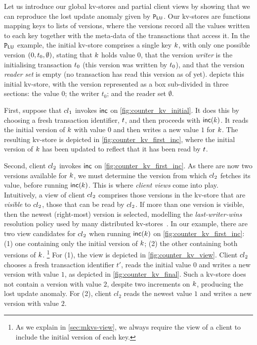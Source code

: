 Let us introduce  our global kv-stores and partial client views by
showing that we can reproduce the lost update anomaly given by 
$\mathtt{P}_{\mathsf{LU}}$.
Our kv-stores are functions mapping keys to lists of versions, where
the versions  record all the values written to each key together with the
meta-data of the transactions that access it. 
In the $\mathtt{P}_{\mathsf{LU}}$ example, the initial kv-store comprises a single key $k$, with only one possible 
version $(0, t_{0}, \emptyset)$,  stating that $k$ holds value $0$, 
that the version \emph{writer} is the initialising transaction
$t_0$ (this version was written by $t_0$), 
and that the version \emph{reader set} is empty (no transaction has read this version as of yet). 
 depicts this initial kv-store, with the version
represented as a box sub-divided in three sections: the value $0$;
the writer $t_0$; and the reader set $\emptyset$. 







First, suppose that ${cl}_1$  invokes $\mathsf{inc}$ on
\cref{fig:counter_kv_initial}. It does this by choosing a fresh
transaction identifier, $t$, 
and then proceeds with $\mathsf{inc}(k)$. It reads the initial version
of $k$ with value $0$ 
and then writes a new value $1$ for $k$. 
The resulting kv-store is depicted in \cref{fig:counter_kv_first_inc},
where  the initial version of $k$  has been  updated to reflect that it
has been read by $t$. 

Second, client ${cl}_2$ invokes $\mathsf{inc}$ on
\cref{fig:counter_kv_first_inc}.  As there are now two versions
available for $k$, we must determine the version from which
${cl}_2$ fetches its value, before running $\mathsf{inc}(k)$.  This is
where \emph{client views} come into play.  Intuitively, a view of
client ${cl}_2$ comprises those versions in the kv-store that are
\emph{visible} to ${cl}_2$, \ie those that can be read by
${cl}_2$.  If more than one version is visible, then the newest
(right-most) version is selected, modelling the \emph{last-writer-wins}
resolution policy used by many distributed
kv-stores~\cite{vogels:2009:ec:1435417.1435432}.  In our example,
there are two view candidates for ${cl}_2$ when running
$\mathsf{inc}(k)$ on \cref{fig:counter_kv_first_inc}: (1) one containing
only the initial version of $k$; (2) the other containing both
versions of $k$.%
\footnote{ As we explain in \cref{sec:mkvs-view}, we always require
  the view of a client to include the initial version of each key.}  
For (1), the view is depicted in
\cref{fig:counter_kv_view}.  Client ${cl}_2$ chooses a fresh
transaction identifier $t'$, reads the initial value $0$ and writes a
new version with value $1$, as depicted in
\cref{fig:counter_kv_final}.  Such a kv-store does not contain a
version with value $2$, despite two increments on $k$, producing
the lost update anomaly.  For (2), client $cl_2$ reads the newest
value $1$ and writes a new version with value $2$.

